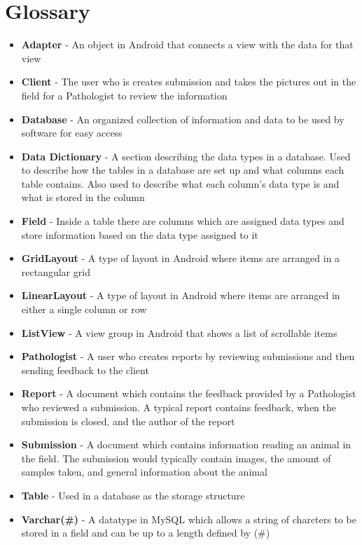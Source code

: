 \documentclass[onecolumn, draftclsnofoot,10pt, compsoc]{IEEEtran}
\begin{document}
\section{Glossary}
\begin{itemize}
\item \textbf{Adapter} - An object in Android that connects a view with the data for that view
\item \textbf{Client} - The user who is creates submission and takes the pictures out in the field for a Pathologist to review the information
\item \textbf{Database} - An organized collection of information and data to be used by software for easy access
\item \textbf{Data Dictionary} - A section describing the data types in a database. Used to describe how the tables in a database are set up and what columns each table contains. Also used to describe what each column's data type is and what is stored in the column
\item \textbf{Field} - Inside a table there are columns which are assigned data types and store information based on the data type assigned to it
\item \textbf{GridLayout} - A type of layout in Android where items are arranged in a rectangular grid
\item \textbf{LinearLayout} - A type of layout in Android where items are arranged in either a single column or row
\item \textbf{ListView} - A view group in Android that shows a list of scrollable items
\item \textbf{Pathologist} - A user who creates reports by reviewing submissions and then sending feedback to the client
\item \textbf{Report} - A document which contains the feedback provided by a Pathologist who reviewed a submission. A typical report contains feedback, when the submission is closed, and the author of the report
\item \textbf{Submission} - A document which contains information reading an animal in the field. The submission would typically contain images, the amount of samples taken, and general information about the animal
\item \textbf{Table} - Used in a database as the storage structure
\item \textbf{Varchar(\#)} - A datatype in MySQL which allows a string of charcters to be stored in a field and can be up to a length defined by (\#)
\end{itemize}
\end{document}
